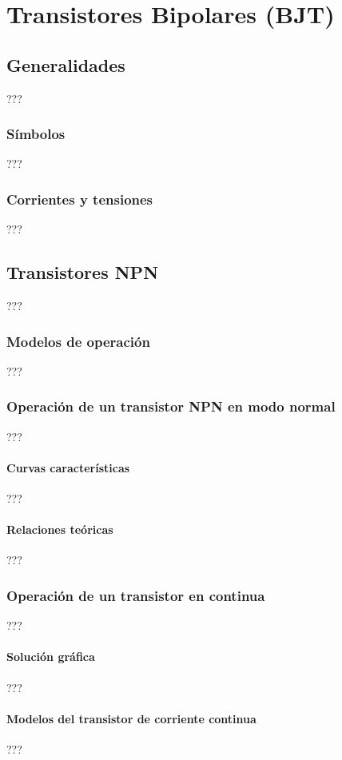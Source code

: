 
\chapter{Transistores Bipolares (BJT)}
\section{Generalidades}
???
\subsection{Símbolos}
???
\subsection{Corrientes y tensiones}
???
\section{Transistores NPN}
???
\subsection{Modelos de operación}
???
\subsection{Operación de un transistor NPN en modo normal}
???
\subsubsection{Curvas características}
???
\subsubsection{Relaciones teóricas}
???
\subsection{Operación de un transistor en continua}
???
\subsubsection{Solución gráfica}
???
\subsubsection{Modelos del transistor de corriente continua}
???
